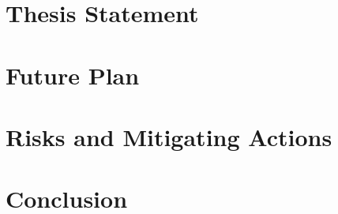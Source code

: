 \documentclass[draft]{article}
\begin{document}
\section{Thesis Statement}
\label{sec:thsis_statement}







\section{Future Plan}
\label{sec:future_plan}








\section{Risks and Mitigating Actions}
\label{sec:risks}







\section{Conclusion}
\label{sec:concluion}















\end{document}
